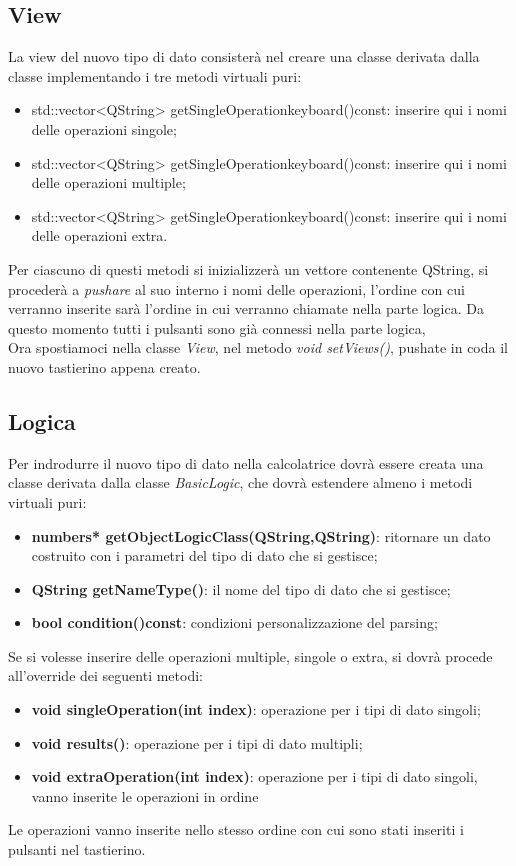 \documentclass[a4paper,10pt]{article}
\begin{document}
        \subsection{View}
        La view del nuovo tipo di dato consisterà nel creare una classe derivata dalla classe  implementando i tre metodi virtuali puri:
        \begin{itemize}
            \item std::vector<QString> getSingleOperationkeyboard()const: inserire qui i nomi delle operazioni singole;
            \item std::vector<QString> getSingleOperationkeyboard()const: inserire qui i nomi delle operazioni multiple;
            \item std::vector<QString> getSingleOperationkeyboard()const: inserire qui i nomi delle operazioni extra.
        \end{itemize}
        Per ciascuno di questi metodi si inizializzerà un vettore contenente QString, si procederà a \textit{pushare} al suo interno i nomi delle operazioni, l'ordine con cui verranno inserite sarà l'ordine in cui verranno chiamate nella parte logica. Da questo momento tutti i pulsanti sono già connessi nella parte logica, \\
        Ora spostiamoci nella classe \textit{View}, nel metodo \textit{void setViews()}, pushate in coda il nuovo tastierino appena creato.
        \subsection{Logica}
        Per indrodurre il nuovo tipo di dato nella calcolatrice dovrà essere creata una classe derivata dalla classe \textit{BasicLogic}, che dovrà estendere almeno i metodi virtuali puri:
        \begin{itemize}
            \item \textbf{numbers* getObjectLogicClass(QString,QString)}: ritornare un dato costruito con i parametri del tipo di dato che si gestisce; 
            \item \textbf{QString getNameType()}: il nome del tipo di dato che si gestisce;
            \item \textbf{bool condition()const}: condizioni personalizzazione del parsing;
        \end{itemize}
        Se si volesse inserire delle operazioni multiple, singole o extra, si dovrà procede all'override dei seguenti metodi:
        \begin{itemize}
            \item \textbf{void singleOperation(int index)}: operazione per i tipi di dato singoli;
            \item \textbf{void results()}: operazione per i tipi di dato multipli;
            \item \textbf{void extraOperation(int index)}: operazione per i tipi di dato singoli, vanno inserite le operazioni in ordine 
        \end{itemize}
        Le operazioni vanno inserite nello stesso ordine con cui sono stati inseriti i pulsanti nel tastierino.
\end{document}
